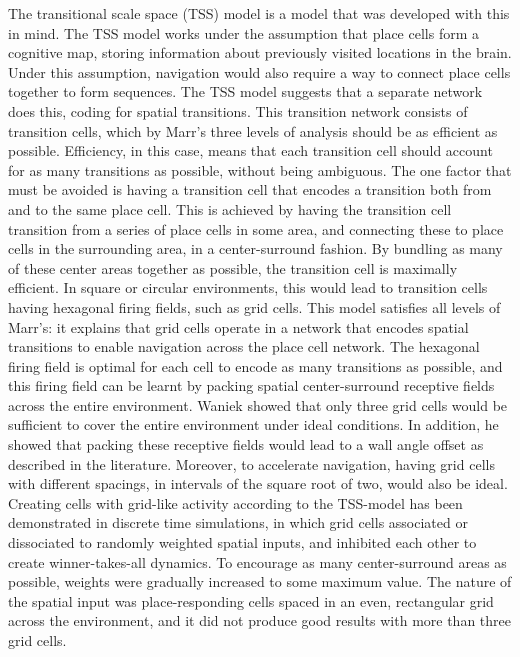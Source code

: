 \documentclass{article}
\begin{document}
    The transitional scale space (TSS) model is a model that was developed with this in mind. The TSS model works under the assumption that place cells form a cognitive map, storing information about previously visited locations in the brain. Under this assumption, navigation would also require a way to connect place cells together to form sequences. The TSS model suggests that a separate network does this, coding for spatial transitions. This transition network consists of transition cells, which by Marr's three levels of analysis should be as efficient as possible. Efficiency, in this case, means that each transition cell should account for as many transitions as possible, without being ambiguous.
    The one factor that must be avoided is having a transition cell that encodes a transition both from and to the same place cell. This is achieved by having the transition cell transition from a series of place cells in some area, and connecting these to place cells in the surrounding area, in a center-surround fashion. By bundling as many of these center areas together as possible, the transition cell is maximally efficient.
    In square or circular environments, this would lead to transition cells having hexagonal firing fields, such as grid cells.
    This model satisfies all levels of Marr's: it explains that grid cells operate in a network that encodes spatial transitions to enable navigation across the place cell network. The hexagonal firing field is optimal for each cell to encode as many transitions as possible, and this firing field can be learnt by packing spatial center-surround receptive fields across the entire environment.
    Waniek showed that only three grid cells would be sufficient to cover the entire environment under ideal conditions. In addition, he showed that packing these receptive fields would lead to a wall angle offset as described in the literature. Moreover, to accelerate navigation, having grid cells with different spacings, in intervals of the square root of two, would also be ideal. 
    Creating cells with grid-like activity according to the TSS-model has been demonstrated in discrete time simulations, in which grid cells associated or dissociated to randomly weighted spatial inputs, and inhibited each other to create winner-takes-all dynamics. To encourage as many center-surround areas as possible, weights were gradually increased to some maximum value. The nature of the spatial input was place-responding cells spaced in an even, rectangular grid across the environment, and it did not produce good results with more than three grid cells.
\end{document}
